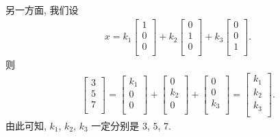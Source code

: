 \begin{example}
    另一方面, 我们设
    \begin{align*}
        x =
        k_1 \begin{bmatrix}
                1 \\ 0 \\ 0 \\
            \end{bmatrix}
        + k_2 \begin{bmatrix}
                  0 \\ 1 \\ 0 \\
              \end{bmatrix}
        + k_3 \begin{bmatrix}
                  0 \\ 0 \\ 1 \\
              \end{bmatrix}.
    \end{align*}
    则
    \begin{align*}
        \begin{bmatrix}
            3 \\ 5 \\ 7 \\
        \end{bmatrix}
        =
        \begin{bmatrix}
            k_1 \\ 0 \\ 0 \\
        \end{bmatrix}
        + \begin{bmatrix}
              0 \\ k_2 \\ 0 \\
          \end{bmatrix}
        + \begin{bmatrix}
              0 \\ 0 \\ k_3 \\
          \end{bmatrix}
        = \begin{bmatrix}
              k_1 \\ k_2 \\ k_3 \\
          \end{bmatrix}.
    \end{align*}
    由此可知,
    \(k_1\), \(k_2\), \(k_3\)
    一定分别是
    \(3\), \(5\), \(7\).
\end{example}

